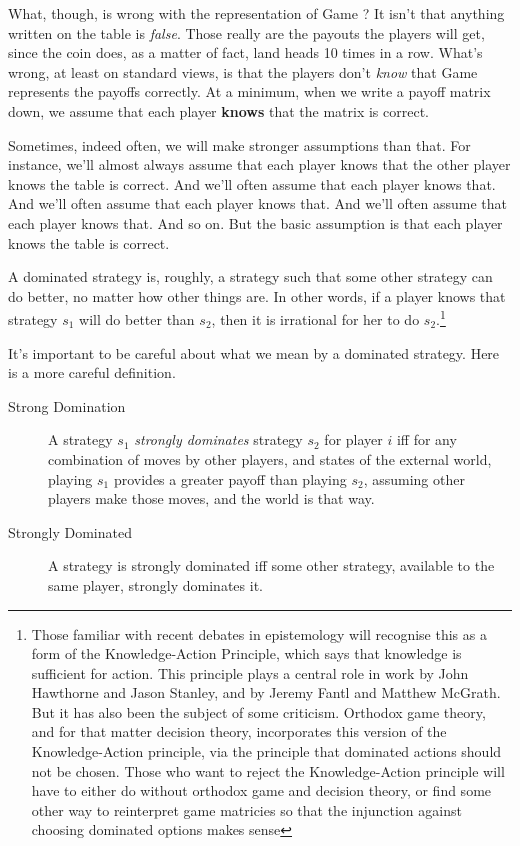 {What, though, is wrong with the representation of Game ? It isn't that anything written on the table is \textit{false}. Those really are the payouts the players will get, since the coin does, as a matter of fact, land heads 10 times in a row. What's wrong, at least on standard views, is that the players don't \textit{know} that Game  represents the payoffs correctly. At a minimum, when we write a payoff matrix down, we assume that each player \textbf{knows} that the matrix is correct.

Sometimes, indeed often, we will make stronger assumptions than that. For instance, we'll almost always assume that each player knows that the other player knows the table is correct. And we'll often assume that each player knows that. And we'll often assume that each player knows that. And we'll often assume that each player knows that. And so on. But the basic assumption is that each player knows the table is correct.} A dominated strategy is, roughly, a strategy such that some other strategy can do better, no matter how other things are. In other words, if a player knows that strategy $s_1$ will do better than $s_2$, then it is irrational for her to do $s_2$.\footnote{Those familiar with recent debates in epistemology will recognise this as a form of the Knowledge-Action Principle, which says that knowledge is sufficient for action. This principle plays a central role in work by John Hawthorne and Jason Stanley, and by Jeremy Fantl and Matthew McGrath. But it has also been the subject of some criticism. Orthodox game theory, and for that matter decision theory, incorporates this version of the Knowledge-Action principle, via the principle that dominated actions should not be chosen. Those who want to reject the Knowledge-Action principle will have to either do without orthodox game and decision theory, or find some other way to reinterpret game matricies so that the injunction against choosing dominated options makes sense}

It's important to be careful about what we mean by a dominated strategy. Here is a more careful definition.

\begin{description}
\item[Strong Domination] A strategy $s_1$ \textit{strongly dominates} strategy $s_2$ for player $i$ iff for any combination of moves by other players, and states of the external world, playing $s_1$ provides a greater payoff than playing $s_2$, assuming other players make those moves, and the world is that way.
\item[Strongly Dominated] A strategy is strongly dominated iff some other strategy, available to the same player, strongly dominates it.
\end{description}

